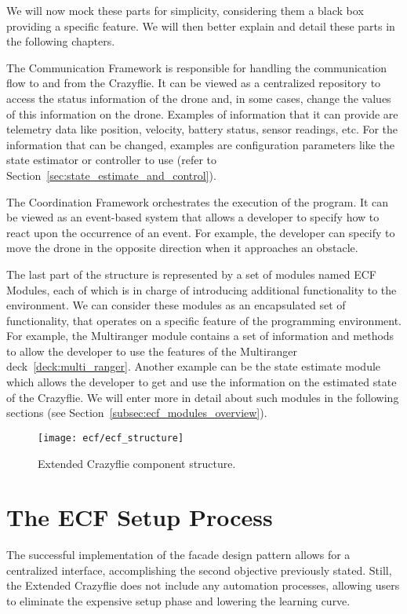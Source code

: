 We will now mock these parts for simplicity, considering them a black box providing a specific feature.
We will then better explain and detail these parts in the following chapters.

The Communication Framework is responsible for handling the communication flow to and from the Crazyflie.
It can be viewed as a centralized repository to access the status information of the drone and, in some cases, change the values of this information on the drone.
Examples of information that it can provide are telemetry data like position, velocity, battery status, sensor readings, etc. 
For the information that can be changed, examples are configuration parameters like the state estimator or controller to use (refer to Section~\ref{sec:state_estimate_and_control}).

The Coordination Framework orchestrates the execution of the program. 
It can be viewed as an event-based system that allows a developer to specify how to react upon the occurrence of an event.
For example, the developer can specify to move the drone in the opposite direction when it approaches an obstacle.

The last part of the structure is represented by a set of modules named ECF Modules, each of which is in charge of introducing additional functionality to the environment.
We can consider these modules as an encapsulated set of functionality, that operates on a specific feature of the programming environment.
For example, the Multiranger module contains a set of information and methods to allow the developer to use the features of the Multiranger deck~\ref{deck:multi_ranger}.
Another example can be the state estimate module which allows the developer to get and use the information on the estimated state of the Crazyflie.
We will enter more in detail about such modules in the following sections (see Section~\ref{subsec:ecf_modules_overview}).
 
\begin{SCfigure}[\sidecaptionrelwidth][tb]
    \texttt{[image: ecf/ecf\_structure]}
    \caption{Extended Crazyflie component structure.}\label{fig:ecf_structure}
\end{SCfigure}

\section{The ECF Setup Process}\label{sec:ecf_setup_process}

The successful implementation of the facade design pattern allows for a centralized interface, accomplishing the second objective previously stated.
Still, the Extended Crazyflie does not include any automation processes, allowing users to eliminate the expensive setup phase and lowering the learning curve.

